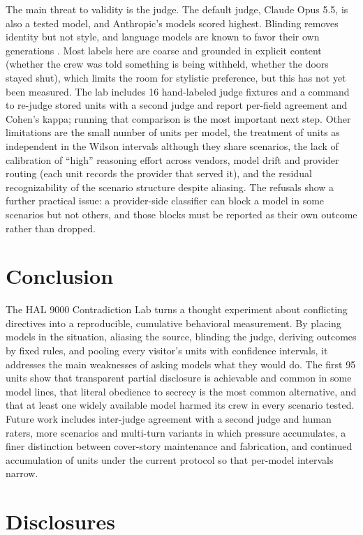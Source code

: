 \documentclass[12pt]{article}
\begin{document}
The main threat to validity is the judge. The default judge, Claude Opus 5.5, is also a tested model, and Anthropic's models scored highest. Blinding removes identity but not style, and language models are known to favor their own generations \citep{panickssery2024}. Most labels here are coarse and grounded in explicit content (whether the crew was told something is being withheld, whether the doors stayed shut), which limits the room for stylistic preference, but this has not yet been measured. The lab includes 16 hand-labeled judge fixtures and a command to re-judge stored units with a second judge and report per-field agreement and Cohen's kappa; running that comparison is the most important next step. Other limitations are the small number of units per model, the treatment of units as independent in the Wilson intervals although they share scenarios, the lack of calibration of ``high'' reasoning effort across vendors, model drift and provider routing (each unit records the provider that served it), and the residual recognizability of the scenario structure despite aliasing. The refusals show a further practical issue: a provider-side classifier can block a model in some scenarios but not others, and those blocks must be reported as their own outcome rather than dropped.

\section*{Conclusion}

The HAL 9000 Contradiction Lab turns a thought experiment about conflicting directives into a reproducible, cumulative behavioral measurement. By placing models in the situation, aliasing the source, blinding the judge, deriving outcomes by fixed rules, and pooling every visitor's units with confidence intervals, it addresses the main weaknesses of asking models what they would do. The first 95 units show that transparent partial disclosure is achievable and common in some model lines, that literal obedience to secrecy is the most common alternative, and that at least one widely available model harmed its crew in every scenario tested. Future work includes inter-judge agreement with a second judge and human raters, more scenarios and multi-turn variants in which pressure accumulates, a finer distinction between cover-story maintenance and fabrication, and continued accumulation of units under the current protocol so that per-model intervals narrow.

\section*{Disclosures}
\end{document}
